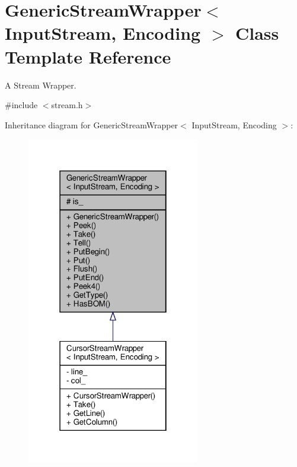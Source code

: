 \hypertarget{classGenericStreamWrapper}{}\section{Generic\+Stream\+Wrapper$<$ Input\+Stream, Encoding $>$ Class Template Reference}
\label{classGenericStreamWrapper}


A Stream Wrapper.  




{\ttfamily \#include $<$stream.\+h$>$}



Inheritance diagram for Generic\+Stream\+Wrapper$<$ Input\+Stream, Encoding $>$\+:
\nopagebreak
\begin{figure}[H]
\begin{center}
\leavevmode
\includegraphics[width=214pt]{classGenericStreamWrapper__inherit__graph}
\end{center}
\end{figure}


